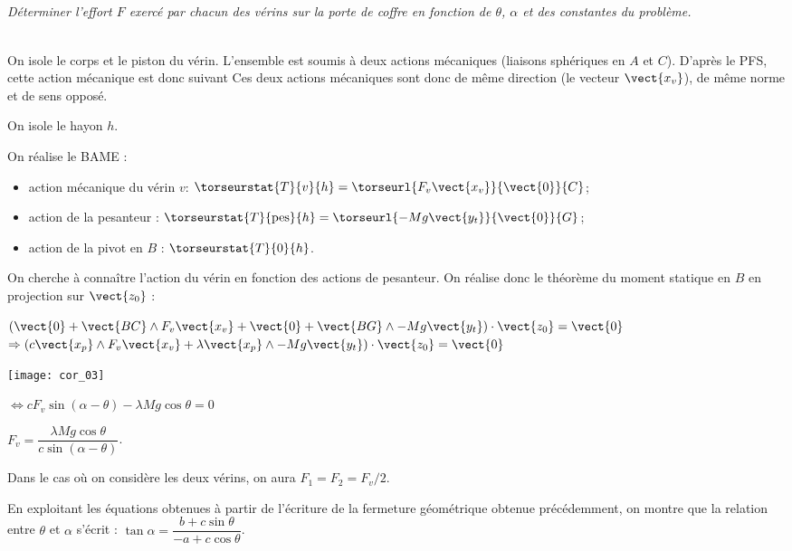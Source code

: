 \subparagraph{}
\textit{Déterminer l’effort $F$ exercé par chacun des vérins sur la porte de coffre en fonction de $\theta$, $\alpha$ et des constantes du problème.}
\ifprof
\begin{corrige}~\\
On isole le corps et le piston du vérin. L'ensemble est soumis à deux actions mécaniques (liaisons sphériques en $A$ et $C$). D'après le PFS, cette action mécanique est donc suivant Ces deux actions mécaniques sont donc de même direction (le vecteur $\vect{x_v}$), de même norme et de sens opposé. 

On isole le hayon $h$. 

On réalise le BAME : 
\begin{itemize}
\item action mécanique du vérin $v$: $\torseurstat{T}{v}{h}=\torseurl{F_v\vect{x_v}}{\vect{0}}{C}$;
\item action de la pesanteur : $\torseurstat{T}{\text{pes}}{h}=\torseurl{-Mg\vect{y_t}}{\vect{0}}{G}$;
\item action de la pivot en $B$ : $\torseurstat{T}{\text{0}}{h}$.
\end{itemize}

On cherche à connaître l'action du vérin en fonction des actions de pesanteur. On réalise donc le théorème du moment statique en $B$ en projection sur $\vect{z_0}$ : 

$ \left( 
\vect{0} + \vect{BC}\wedge F_v\vect{x_v}
+ \vect{0} + \vect{BG}\wedge -Mg\vect{y_t}
\right) \cdot \vect {z_0} = \vect{0} $
$\Rightarrow \left( c\vect{x_p}\wedge F_v\vect{x_v} + \lambda \vect{x_p}\wedge -Mg\vect{y_t}
\right) \cdot \vect {z_0} = \vect{0} $

\begin{center}
\texttt{[image: cor\_03]}

$\Leftrightarrow  c F_v\sin \left( \alpha - \theta\right) - \lambda Mg\cos \theta  = {0} $

$   F_v = \dfrac{\lambda Mg\cos \theta}{c\sin \left( \alpha - \theta\right)} $.

Dans le cas où on considère les deux vérins, on aura $F_1=F_2=F_v/2$.

\end{center}


\end{corrige}


\else
\fi

\ifprof
\else
En exploitant les équations obtenues à partir de l’écriture de la fermeture géométrique obtenue précédemment, on montre que la relation entre $\theta$ et $\alpha$ s’écrit : 
$ \tan \alpha = \dfrac{b+c\sin\theta}{-a+c\cos\theta}$.


